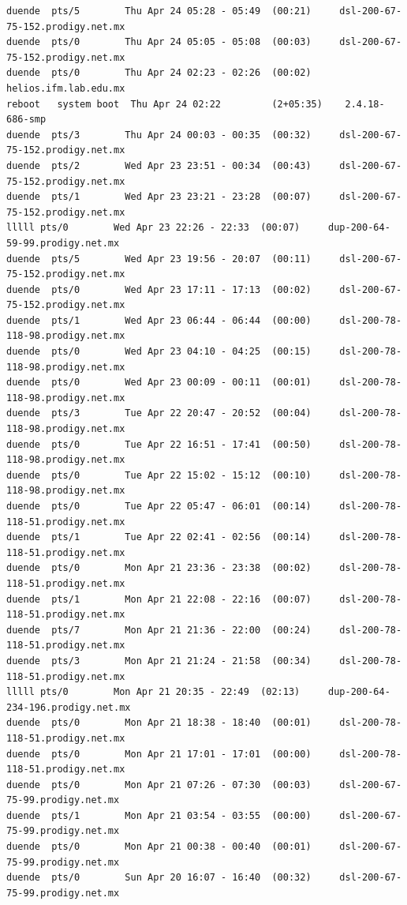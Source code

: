 \begin{lstlisting}[style=terminal]
duende  pts/5        Thu Apr 24 05:28 - 05:49  (00:21)     dsl-200-67-75-152.prodigy.net.mx
duende  pts/0        Thu Apr 24 05:05 - 05:08  (00:03)     dsl-200-67-75-152.prodigy.net.mx
duende  pts/0        Thu Apr 24 02:23 - 02:26  (00:02)     helios.ifm.lab.edu.mx
reboot   system boot  Thu Apr 24 02:22         (2+05:35)    2.4.18-686-smp
duende  pts/3        Thu Apr 24 00:03 - 00:35  (00:32)     dsl-200-67-75-152.prodigy.net.mx
duende  pts/2        Wed Apr 23 23:51 - 00:34  (00:43)     dsl-200-67-75-152.prodigy.net.mx
duende  pts/1        Wed Apr 23 23:21 - 23:28  (00:07)     dsl-200-67-75-152.prodigy.net.mx
lllll pts/0        Wed Apr 23 22:26 - 22:33  (00:07)     dup-200-64-59-99.prodigy.net.mx
duende  pts/5        Wed Apr 23 19:56 - 20:07  (00:11)     dsl-200-67-75-152.prodigy.net.mx
duende  pts/0        Wed Apr 23 17:11 - 17:13  (00:02)     dsl-200-67-75-152.prodigy.net.mx
duende  pts/1        Wed Apr 23 06:44 - 06:44  (00:00)     dsl-200-78-118-98.prodigy.net.mx
duende  pts/0        Wed Apr 23 04:10 - 04:25  (00:15)     dsl-200-78-118-98.prodigy.net.mx
duende  pts/0        Wed Apr 23 00:09 - 00:11  (00:01)     dsl-200-78-118-98.prodigy.net.mx
duende  pts/3        Tue Apr 22 20:47 - 20:52  (00:04)     dsl-200-78-118-98.prodigy.net.mx
duende  pts/0        Tue Apr 22 16:51 - 17:41  (00:50)     dsl-200-78-118-98.prodigy.net.mx
duende  pts/0        Tue Apr 22 15:02 - 15:12  (00:10)     dsl-200-78-118-98.prodigy.net.mx
duende  pts/0        Tue Apr 22 05:47 - 06:01  (00:14)     dsl-200-78-118-51.prodigy.net.mx
duende  pts/1        Tue Apr 22 02:41 - 02:56  (00:14)     dsl-200-78-118-51.prodigy.net.mx
duende  pts/0        Mon Apr 21 23:36 - 23:38  (00:02)     dsl-200-78-118-51.prodigy.net.mx
duende  pts/1        Mon Apr 21 22:08 - 22:16  (00:07)     dsl-200-78-118-51.prodigy.net.mx
duende  pts/7        Mon Apr 21 21:36 - 22:00  (00:24)     dsl-200-78-118-51.prodigy.net.mx
duende  pts/3        Mon Apr 21 21:24 - 21:58  (00:34)     dsl-200-78-118-51.prodigy.net.mx
lllll pts/0        Mon Apr 21 20:35 - 22:49  (02:13)     dup-200-64-234-196.prodigy.net.mx
duende  pts/0        Mon Apr 21 18:38 - 18:40  (00:01)     dsl-200-78-118-51.prodigy.net.mx
duende  pts/0        Mon Apr 21 17:01 - 17:01  (00:00)     dsl-200-78-118-51.prodigy.net.mx
duende  pts/0        Mon Apr 21 07:26 - 07:30  (00:03)     dsl-200-67-75-99.prodigy.net.mx
duende  pts/1        Mon Apr 21 03:54 - 03:55  (00:00)     dsl-200-67-75-99.prodigy.net.mx
duende  pts/0        Mon Apr 21 00:38 - 00:40  (00:01)     dsl-200-67-75-99.prodigy.net.mx
duende  pts/0        Sun Apr 20 16:07 - 16:40  (00:32)     dsl-200-67-75-99.prodigy.net.mx

\end{lstlisting}
